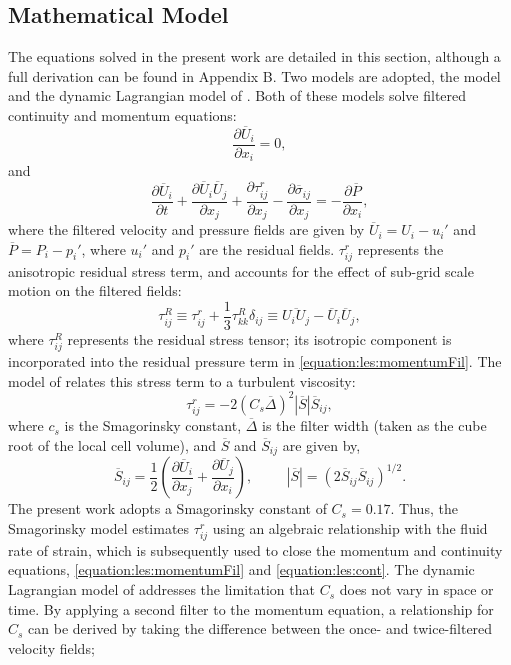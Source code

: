 \documentclass[12pt,oneside,a4paper]{article}
\newcommand{\pdev}[2]{\frac{\partial {#1}}{\partial {#2}}}
\begin{document}
\subsection{Mathematical Model}
The equations solved in the present work are detailed in this section, although a full derivation can be found in Appendix B. Two models are adopted, the \cite{smagorinsky1963} model and the dynamic Lagrangian model of \cite{meneveau1996}. Both of these models solve filtered continuity and momentum equations:
\begin{equation}
\label{equation:les:cont}
\pdev{\overline{U}_i}{x_i} = 0,
\end{equation}
and
\begin{equation}
\label{equation:les:momentumFil}
\pdev{\overline{U}_i}{t} + \pdev{\overline{U}_i \overline{U}_j}{x_j} + \pdev{\tau_{ij}^r}{x_j} - \pdev{\overline{\sigma}_{ij}}{x_j} = - \pdev{\overline{P}}{x_i},
\end{equation}
where the filtered velocity and pressure fields are given by $\overline{U}_i = U_i - u_i'$ and $\overline{P} = P_i - p_i'$, where $u_i'$ and $p_i'$ are the residual fields. $\tau_{ij}^r$ represents the anisotropic residual stress term, and accounts for the effect of sub-grid scale motion on the filtered fields:
\begin{equation}
\tau_{ij}^R \equiv  \tau_{ij}^r + \frac{1}{3} \tau_{kk}^R \delta_{ij}  \equiv \overline{U_i U_j} - \overline{U}_i \overline{U}_j,
\end{equation}
where $\tau_{ij}^R$ represents the residual stress tensor; its isotropic component is incorporated into the residual pressure term in \eqref{equation:les:momentumFil}. The model of \cite{smagorinsky1963} relates this stress term to a turbulent viscosity:
\begin{equation}
\label{equation:les:residualStress}
\tau_{ij}^r = - 2 (C_s \overline{\Delta})^2 |\overline{S}| \overline{S}_{ij},
\end{equation}
where $c_s$ is the Smagorinsky constant, $\overline{\Delta}$ is the filter width (taken as the cube root of the local cell volume), and $\overline{S}$ and $\overline{S}_{ij}$ are given by,
\begin{equation}
\overline{S}_{ij} = \frac{1}{2}\left(  \pdev{\overline{U}_i}{x_j} + \pdev{\overline{U}_j}{x_i}  \right), \hspace{1cm} |\overline{S}| = (2 \overline{S}_{ij} \overline{S}_{ij})^{1/2}.
\end{equation}
The present work adopts a Smagorinsky constant of $C_s = 0.17$. Thus, the Smagorinsky model estimates $\tau_{ij}^r$ using an algebraic relationship with the fluid rate of strain, which is subsequently used to close the momentum and continuity equations, \eqref{equation:les:momentumFil} and \eqref{equation:les:cont}. The dynamic Lagrangian model of \cite{meneveau1996} addresses the limitation that $C_s$ does not vary in space or time. By applying a second filter to the momentum equation, a relationship for $C_s$ can be derived by taking the difference between the once- and twice-filtered velocity fields;
\end{document}

